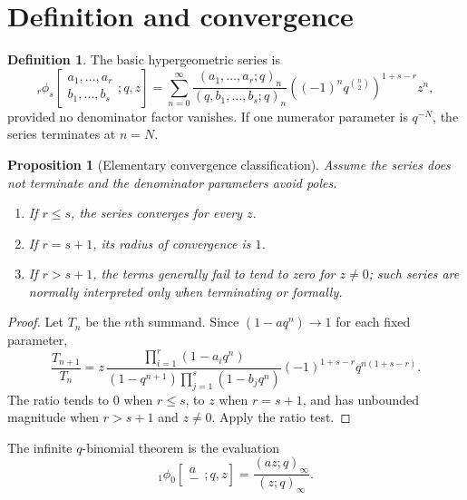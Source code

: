 \documentclass[11pt,a4paper,oneside,openany]{book}
\newtheorem{proposition}[proposition]{Proposition}
\theoremstyle{definition}
\newtheorem{definition}[definition]{Definition}
\theoremstyle{remark}
\begin{document}
\section{Definition and convergence}

\begin{definition}\label{qg:def-basic-hypergeometric-series}
The basic hypergeometric series is
\[
 {}_r\phi_s\!\left[
 \begin{matrix}a_1,\dots,a_r\\ b_1,\dots,b_s\end{matrix};q,z\right]
 =\sum_{n=0}^{\infty}
 \frac{(a_1,\dots,a_r;q)_n}{(q,b_1,\dots,b_s;q)_n}
 \left((-1)^nq^{\binom n2}\right)^{1+s-r}z^n,
\]
provided no denominator factor vanishes.  If one numerator parameter is $q^{-N}$, the series terminates at $n=N$.
\end{definition}

\begin{proposition}[Elementary convergence classification]\label{prop:phi-convergence}
Assume the series does not terminate and the denominator parameters avoid poles.
\begin{enumerate}[label=\textup{(\roman*)}]
\item If $r\le s$, the series converges for every $z$.
\item If $r=s+1$, its radius of convergence is $1$.
\item If $r>s+1$, the terms generally fail to tend to zero for $z\ne0$; such series are normally interpreted only when terminating or formally.
\end{enumerate}
\end{proposition}

\begin{proof}
Let $T_n$ be the $n$th summand.  Since $(1-aq^n)\to1$ for each fixed parameter,
\[
 \frac{T_{n+1}}{T_n}
 =z\,\frac{\prod_{i=1}^{r}(1-a_iq^n)}
 {(1-q^{n+1})\prod_{j=1}^{s}(1-b_jq^n)}
 (-1)^{1+s-r}q^{n(1+s-r)}.
\]
The ratio tends to $0$ when $r\le s$, to $z$ when $r=s+1$, and has unbounded magnitude when $r>s+1$ and $z\ne0$.  Apply the ratio test.
\end{proof}

The infinite $q$-binomial theorem is the evaluation
\[
 {}_1\phi_0\!\left[\begin{matrix}a\\-\end{matrix};q,z\right]
 =\frac{(az;q)_\infty}{(z;q)_\infty}.
\]

\end{document}
